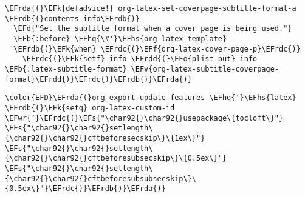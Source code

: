 \documentclass{article}
\newcommand{\EFs}[1]{\textcolor{EFs}{#1}} %
\newcommand{\EFd}[1]{\textcolor{EFd}{#1}} %
\newcommand{\EFk}[1]{\textcolor{EFk}{#1}} %
\newcommand{\EFb}[1]{\textcolor{EFb}{#1}} %
\newcommand{\EFf}[1]{\textcolor{EFf}{#1}} %
\newcommand{\EFv}[1]{\textcolor{EFv}{#1}} %
\newcommand{\EFo}[1]{\textcolor{EFo}{#1}} %
\newcommand{\EFwr}[1]{\textcolor{EFwr}{#1}} %
\newcommand{\EFhq}[1]{#1} %
\newcommand{\EFhs}[1]{\textcolor{EFhs}{#1}} %
\newcommand{\EFrda}[1]{\textcolor{EFrda}{#1}} %
\newcommand{\EFrdb}[1]{\textcolor{EFrdb}{#1}} %
\newcommand{\EFrdc}[1]{\textcolor{EFrdc}{#1}} %
\newcommand{\EFrdd}[1]{\textcolor{EFrdd}{#1}} %
\begin{document}
\begin{Code}
\begin{Verbatim}
\EFrda{(}\EFk{defadvice!} org-latex-set-coverpage-subtitle-format-a \EFrdb{(}contents info\EFrdb{)}
  \EFd{"Set the subtitle format when a cover page is being used."}
  \EFb{:before} \EFhq{\#'}\EFhs{org-latex-template}
  \EFrdb{(}\EFk{when} \EFrdc{(}\EFf{org-latex-cover-page-p}\EFrdc{)}
    \EFrdc{(}\EFk{setf} info \EFrdd{(}\EFo{plist-put} info \EFb{:latex-subtitle-format} \EFv{org-latex-subtitle-coverpage-format}\EFrdd{)}\EFrdc{)}\EFrdb{)}\EFrda{)}
\end{Verbatim}
\end{Code}

\begin{Code}
\begin{Verbatim}
\color{EFD}\EFrda{(}org-export-update-features \EFhq{'}\EFhs{latex}
\EFrdb{(}\EFk{setq} org-latex-custom-id \EFwr{’}\EFrdc{(}\EFs{"\char92{}\char92{}usepackage\{tocloft\}"}
\EFs{"\char92{}\char92{}setlength\{\char92{}\char92{}cftbeforesecskip\}\{1ex\}"}
\EFs{"\char92{}\char92{}setlength\{\char92{}\char92{}cftbeforesubsecskip\}\{0.5ex\}"}
\EFs{"\char92{}\char92{}setlength\{\char92{}\char92{}cftbeforesubsubsecskip\}\{0.5ex\}"}\EFrdc{)}\EFrdb{)}\EFrda{)}
\end{Verbatim}
\end{Code}
\end{document}
